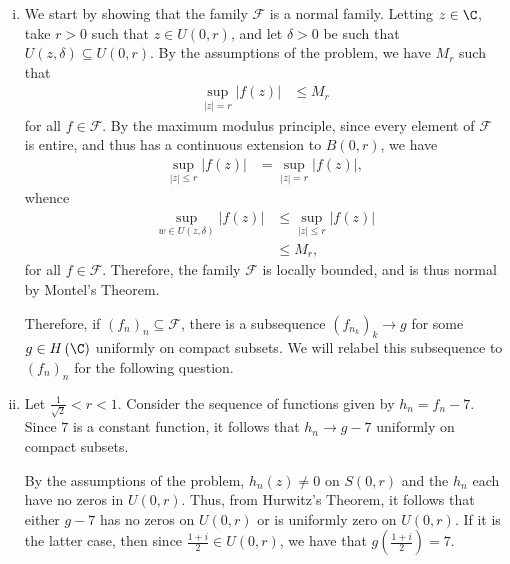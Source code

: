 \documentclass[10pt]{mypackage}
\begin{document}
\begin{solution}\hfill
  \begin{enumerate}[(i)]
    \item We start by showing that the family $\mathcal{F}$ is a normal family. Letting $z\in \C$, take $r > 0$ such that $z\in U\left( 0,r \right)$, and let $\delta > 0$ be such that $U\left( z,\delta \right)\subseteq U\left( 0,r \right)$. By the assumptions of the problem, we have $M_r$ such that
      \begin{align*}
        \sup_{|z| = r} \left\vert f(z) \right\vert &\leq M_r
      \end{align*}
      for all $f\in \mathcal{F}$. By the maximum modulus principle, since every element of $\mathcal{F}$ is entire, and thus has a continuous extension to $B\left( 0,r \right)$, we have
      \begin{align*}
        \sup_{|z| \leq r} \left\vert f(z) \right\vert &= \sup_{|z| = r} \left\vert f(z) \right\vert,
      \end{align*}
      whence
      \begin{align*}
        \sup_{w\in U\left( z,\delta \right)} \left\vert f(z) \right\vert &\leq \sup_{|z|\leq r} \left\vert f(z) \right\vert\\
                                                                         &\leq M_r,
      \end{align*}
      for all $f\in \mathcal{F}$. Therefore, the family $\mathcal{F}$ is locally bounded, and is thus normal by Montel's Theorem.%

      Therefore, if $\left( f_n \right)_n\subseteq \mathcal{F}$, there is a subsequence $\left( f_{n_k} \right)_k\rightarrow g$ for some $g\in H\left( \C \right)$ uniformly on compact subsets. We will relabel this subsequence to $\left( f_n \right)_n$ for the following question.
    \item Let $\frac{1}{\sqrt{2}} < r < 1$. Consider the sequence of functions given by $h_n = f_n - 7$. Since $7$ is a constant function, it follows that $h_n\rightarrow g - 7$ uniformly on compact subsets.%

      By the assumptions of the problem, $h_n(z) \neq 0$ on $S\left( 0,r \right)$ and the $h_n$ each have no zeros in $U\left( 0,r \right)$. Thus, from Hurwitz's Theorem, it follows that either $g-7$ has no zeros on $U\left( 0,r \right)$ or is uniformly zero on $U\left( 0,r \right)$. If it is the latter case, then since $\frac{1+i}{2}\in U\left( 0,r \right)$, we have that $g\left( \frac{1+i}{2} \right) = 7$.
  \end{enumerate}
\end{solution}
\end{document}
